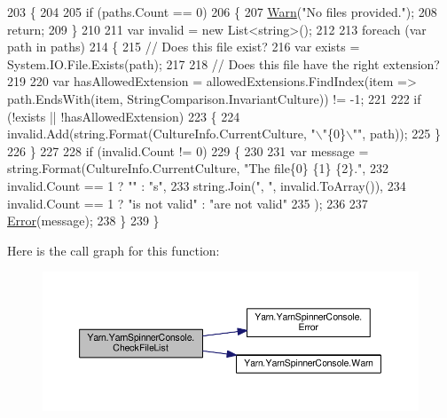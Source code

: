 \begin{DoxyCode}
203         \{
204 
205             \textcolor{keywordflow}{if} (paths.Count == 0)
206             \{
207                 \hyperlink{a00172_a979bb6f049b6c5294f745a19e24ddd9d}{Warn}(\textcolor{stringliteral}{"No files provided."});
208                 \textcolor{keywordflow}{return};
209             \}
210 
211             var invalid = \textcolor{keyword}{new} List<string>();
212 
213             \textcolor{keywordflow}{foreach} (var path \textcolor{keywordflow}{in} paths)
214             \{
215                 \textcolor{comment}{// Does this file exist?}
216                 var exists = System.IO.File.Exists(path);
217 
218                 \textcolor{comment}{// Does this file have the right extension?}
219 
220                 var hasAllowedExtension = allowedExtensions.FindIndex(item => path.EndsWith(item, 
      StringComparison.InvariantCulture)) != -1;
221 
222                 \textcolor{keywordflow}{if} (!exists || !hasAllowedExtension)
223                 \{
224                     invalid.Add(string.Format(CultureInfo.CurrentCulture, \textcolor{stringliteral}{"\(\backslash\)"\{0\}\(\backslash\)""}, path));
225                 \}
226             \}
227 
228             \textcolor{keywordflow}{if} (invalid.Count != 0)
229             \{
230 
231                 var message = string.Format(CultureInfo.CurrentCulture, \textcolor{stringliteral}{"The file\{0\} \{1\} \{2\}."},
232                     invalid.Count == 1 ? \textcolor{stringliteral}{""} : \textcolor{stringliteral}{"s"},
233                                             string.Join(\textcolor{stringliteral}{", "}, invalid.ToArray()),
234                     invalid.Count == 1 ? \textcolor{stringliteral}{"is not valid"} : \textcolor{stringliteral}{"are not valid"}
235                 );
236 
237                 \hyperlink{a00172_a2f63f9f5b7634cb50ee75ff2eb18b137}{Error}(message);
238             \}
239         \}
\end{DoxyCode}


Here is the call graph for this function\-:
\nopagebreak
\begin{figure}[H]
\begin{center}
\leavevmode
\includegraphics[width=350pt]{a00172_ad77564b25725a771f0fd4da430582e6f_cgraph}
\end{center}
\end{figure}





